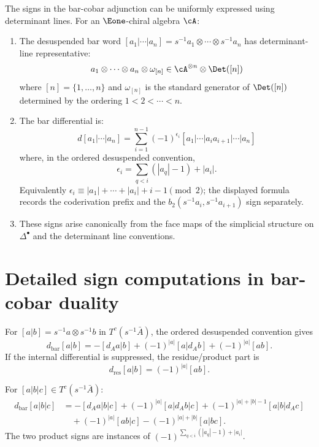 \begin{theorem}
\label{thm:det-bar-cobar-signs}
The signs in the bar-cobar adjunction can be uniformly expressed using
determinant lines. For an $\Eone$-chiral algebra $\cA$:
\begin{enumerate}[label=(\roman*)]
\item The desuspended bar word
$[a_1|\cdots|a_n]=s^{-1}a_1\otimes\cdots\otimes s^{-1}a_n$
has determinant-line representative:
\[
a_1 \otimes \cdots \otimes a_n \otimes \omega_{[n]} \in \cA^{\otimes n} \otimes \Det([n])
\]
where $[n] = \{1, \ldots, n\}$ and $\omega_{[n]}$ is the standard generator of
$\Det([n])$ determined by the ordering $1 < 2 < \cdots < n$.

\item The bar differential is:
\[
d[a_1 | \cdots | a_n] = \sum_{i=1}^{n-1} (-1)^{\epsilon_i} [a_1 | \cdots | a_i a_{i+1} | \cdots | a_n]
\]
where, in the ordered desuspended convention,
\[
\epsilon_i=\sum_{q<i}(|a_q|-1)+|a_i|.
\]
Equivalently $\epsilon_i\equiv |a_1|+\cdots+|a_i|+i-1\pmod 2$; the
displayed formula records the coderivation prefix and the
$b_2(s^{-1}a_i,s^{-1}a_{i+1})$ sign separately.

\item These signs arise canonically from the face maps of the simplicial
structure on $\Delta^\bullet$ and the determinant line conventions.
\end{enumerate}
\end{theorem}


\section{Detailed sign computations in bar-cobar duality}
\label{sec:detailed-signs}

\begin{computation}
\label{comp:bar-signs-2-1}
\label{comp:bar-signs-3-2}
For $[a|b]=s^{-1}a\otimes s^{-1}b$ in
$T^c(s^{-1}\bar A)$, the ordered desuspended convention gives
\[
d_{\mathrm{bar}}[a|b]
=-[d_Aa|b]+(-1)^{|a|}[a|d_Ab]+(-1)^{|a|}[ab].
\]
If the internal differential is suppressed, the residue/product part is
\[
d_{\mathrm{res}}[a|b]=(-1)^{|a|}[ab].
\]

For $[a|b|c]\in T^c(s^{-1}\bar A)$:
\begin{align*}
d_{\mathrm{bar}}[a|b|c]
&= -[d_Aa|b|c]+(-1)^{|a|}[a|d_Ab|c]
   +(-1)^{|a|+|b|-1}[a|b|d_Ac] \\
&\quad +(-1)^{|a|}[ab|c]
   -(-1)^{|a|+|b|}[a|bc].
\end{align*}
The two product signs are instances of
$(-1)^{\sum_{q<i}(|a_q|-1)+|a_i|}$.
\end{computation}

